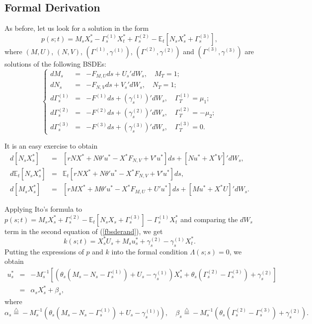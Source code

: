 \documentclass[final]{siamltex}
\begin{document}
\subsection{Formal Derivation}
As before, let us look for a solution in the form
\begin{equation}\label{prand}
p(s;t)=M_s X_s^*- \Gamma_s^{(1)} X_t^*+\Gamma_s^{(2)} - \mathbb E_t[N_s X_s^*+\Gamma_s^{(3)}] ,
\end{equation}
where $(M,U)$, $(N,V)$, $(\Gamma^{(1)}, \gamma^{(1)})$,  $(\Gamma^{(2)}, \gamma^{(2)})$ and $(\Gamma^{(3)}, \gamma^{(3)})$ are solutions of the following BSDEs:
\begin{equation}\label{5bsde}
\left\{
\begin{array}{rcl}
dM_s&=&-F_{M,U}ds+U_s 'dW_s,\quad M_T=1;\\
dN_s&=&-F_{N,V}ds+V_s' dW_s,\quad N_T=1;\\
d\Gamma^{(1)}_s&=&-F^{(1)}ds+(\gamma^{(1)}_s)' dW_s,\quad \Gamma^{(1)}_T=\mu_1;\\
d\Gamma^{(2)}_s&=&-F^{(2)}ds+(\gamma^{(2)}_s)'dW_s,\quad \Gamma^{(2)}_T=-\mu_2;\\
d\Gamma^{(3)}_s&=&-F^{(3)}ds+(\gamma^{(3)}_s)'dW_s,\quad \Gamma^{(3)}_T=0.
\end{array}\right.
\end{equation}

It is an easy exercise to obtain
\begin{eqnarray*}
d[N_sX^*_s]&=&[rNX^*+N\theta'u^*-X^*F_{N,V}+V'u^*]ds+[Nu^*+X^*V]'dW_s,\\
d \mathbb E_t[N_sX^*_s]&=&\mathbb E_t[rNX^*+N\theta'u^*-X^*F_{N,V}+V'u^*]ds,\\
d[M_sX^*_s]&=&[rMX^*+M\theta' u^*-X^*F_{M,U}+U'u^*]ds+[Mu^*+X^*U]'dW_s.
\end{eqnarray*}

Applying Ito's formula to $p(s;t)=M_s X_s^* + \Gamma_s^{(2)} - \mathbb E_t[N_s X_s+\Gamma_s^{(3)}] -\Gamma^{(1)}_s X^*_t$ and comparing the $dW_s$
term in the second equation of (\ref{fbsderand}), we get
\begin{equation}\label{krand}
k(s;t)=X_s^*U_s+M_s u_s^* +\gamma^{(2)}_s-\gamma^{(1)}_sX^*_t.
\end{equation}
Putting the expressions of $p$ and $k$ into the formal
condition $\Lambda(s;s)=0$, we obtain
\begin{eqnarray*}
 u^*_s&=&-M_s^{-1}\left[\left(\theta_s(M_s-N_s-\Gamma^{(1)}_s)+U_s-\gamma^{(1)}_s\right)X^*_s+\theta_s
 (\Gamma^{(2)}_s-\Gamma^{(3)}_s)+\gamma^{(2)}_s\right]\\
&=&\alpha_s X_s^* + \beta_s,
\end{eqnarray*}
where
$$\alpha_s{\stackrel{\triangle}{=}} -M_s^{-1}\left(\theta_s (M_s-N_s-\Gamma^{(1)}_s)+U_s-\gamma^{(1)}_s)\right), \quad \beta_s{\stackrel{\triangle}{=}} -M_s^{-1}\left(\theta_s (\Gamma^{(2)}_s-\Gamma^{(3)}_s)
+\gamma^{(2)}_s\right).$$
\end{document}
